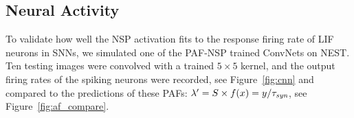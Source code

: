 	
	\subsection{Neural Activity}
	To validate how well the NSP activation fits to the response firing rate of LIF neurons in SNNs, we simulated one of the PAF-NSP trained ConvNets on NEST.
	Ten testing images were convolved with a trained $5\times5$ kernel, and the output firing rates of the spiking neurons were recorded, see Figure~\ref{fig:cnn} and compared to the predictions of these PAFs: $\lambda' = S \times f(x) = y/\tau_{\textit{\textrm{syn}}}$, see Figure~\ref{fig:af_compare}.
	
